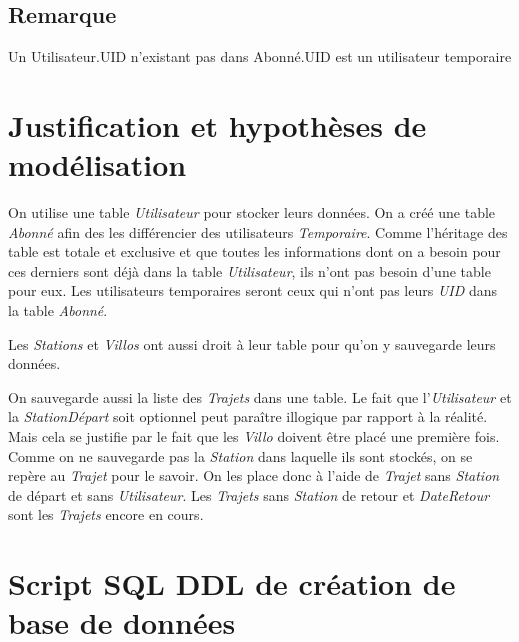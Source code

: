 \documentclass[a4paper, 12pt]{report}
\begin{document}
	\subsection*{Remarque}
	Un Utilisateur.UID n'existant pas dans Abonné.UID est un utilisateur temporaire

\section*{Justification et hypothèses de modélisation} %

On utilise une table \textit{Utilisateur} pour stocker leurs données. On a créé une table \textit{Abonné} afin des les différencier des utilisateurs \textit{Temporaire}. Comme l'héritage des table est totale et exclusive et que toutes les informations dont on a besoin pour ces derniers sont déjà dans la table \textit{Utilisateur}, ils n'ont pas besoin d'une table pour eux. Les utilisateurs temporaires seront ceux qui n'ont pas leurs \textit{UID} dans la table \textit{Abonné}.

Les \textit{Stations} et \textit{Villos} ont aussi droit à leur table pour qu'on y sauvegarde leurs données.

On sauvegarde aussi la liste des \textit{Trajets} dans une table. Le fait que l'\textit{Utilisateur} et la \textit{StationDépart} soit optionnel peut paraître illogique par rapport à la réalité. Mais cela se justifie par le fait que les \textit{Villo} doivent être placé une première fois. Comme on ne sauvegarde pas la \textit{Station} dans laquelle ils sont stockés, on se repère au \textit{Trajet} pour le savoir. On les place donc à l'aide de \textit{Trajet} sans \textit{Station} de départ et sans \textit{Utilisateur}. Les \textit{Trajets} sans \textit{Station} de retour et \textit{DateRetour} sont les \textit{Trajets} encore en cours.

\section*{Script SQL DDL de création de base de données}
\end{document}
